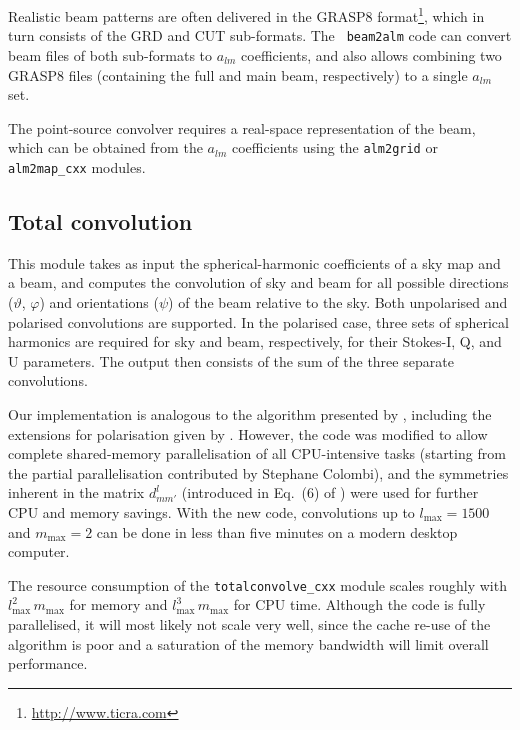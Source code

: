 \documentclass{aa}
\begin{document}
Realistic beam patterns are often delivered in the GRASP8 format\footnote{\href{http://www.ticra.com}{http://www.ticra.com}},
which in turn consists of the GRD and CUT sub-formats. The {\tt
beam2alm} code can convert beam files of both sub-formats to $a_{lm}$
coefficients, and also allows combining two GRASP8 files (containing
the full and main beam, respectively) to a single $a_{lm}$ set.

The point-source convolver requires a real-space representation of the
beam, which can be obtained from the $a_{lm}$ coefficients using the
{\tt alm2grid} or {\tt alm2map\_cxx} modules.

\subsection {Total convolution}
\label{totalconvolve}

This module takes as input the spherical-harmonic coefficients of a
sky map and a beam, and computes the convolution of sky and beam for
all possible directions ($\vartheta$, $\varphi$) and orientations
($\psi$) of the beam relative to the sky. Both unpolarised and
polarised convolutions are supported. In the polarised case, three
sets of spherical harmonics are required for sky and beam,
respectively, for their Stokes-I, Q, and U parameters. The output then
consists of the sum of the three separate convolutions.

Our implementation is analogous to the algorithm presented by
\citet{wandelt-gorski-2001}, including the extensions for polarisation
given by \citet{challinor-etal-2000}. However, the code was modified
to allow complete shared-memory parallelisation of all CPU-intensive
tasks (starting from the partial parallelisation contributed by
Stephane Colombi), and the symmetries inherent in the matrix $d_{mm'}^{l}$
(introduced in Eq.~(6) of \citealt{wandelt-gorski-2001}) were used for
further CPU and memory savings. With the new code, convolutions up to
$l_{\text{max}}=1500$ and $m_{\text{max}}=2$ can be done in less than
five minutes on a modern desktop computer.

The resource consumption of the {\tt totalconvolve\_cxx} module scales
roughly with $l_{\text{max}}^2\,m_{\text{max}}$ for memory and
$l_{\text{max}}^3\,m_{\text{max}}$ for CPU time. Although the code is
fully parallelised, it will most likely not scale very well, since the
cache re-use of the algorithm is poor and a saturation of the memory
bandwidth will limit overall performance.
\end{document}

